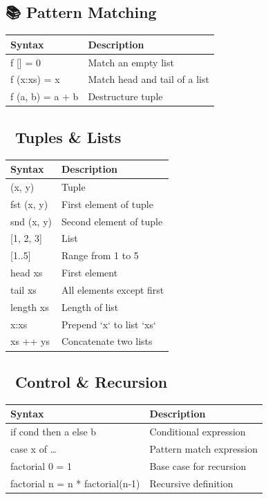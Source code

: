 \documentclass[11pt]{article}
\begin{document}
\subsection{📚 Pattern Matching}
\label{sec:orgecf484c}
\begin{center}
\begin{tabular}{ll}
Syntax & Description\\
\hline
f [] = 0 & Match an empty list\\
f (x:xs) = x & Match head and tail of a list\\
f (a, b) = a + b & Destructure tuple\\
\end{tabular}
\end{center}
\subsection{🧩 Tuples \& Lists}
\label{sec:org2987e9f}
\begin{center}
\begin{tabular}{ll}
Syntax & Description\\
\hline
(x, y) & Tuple\\
fst (x, y) & First element of tuple\\
snd (x, y) & Second element of tuple\\
{[}1, 2, 3] & List\\
{[}1..5] & Range from 1 to 5\\
head xs & First element\\
tail xs & All elements except first\\
length xs & Length of list\\
x:xs & Prepend `x` to list `xs`\\
xs ++ ys & Concatenate two lists\\
\end{tabular}
\end{center}
\subsection{🔁 Control \& Recursion}
\label{sec:orgdcf046c}
\begin{center}
\begin{tabular}{ll}
Syntax & Description\\
\hline
if cond then a else b & Conditional expression\\
case x of \ldots{} & Pattern match expression\\
factorial 0 = 1 & Base case for recursion\\
factorial n = n * factorial(n-1) & Recursive definition\\
\end{tabular}
\end{center}
\end{document}
